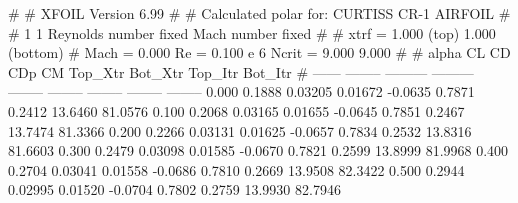 #  
#       XFOIL         Version 6.99
#  
# Calculated polar for: CURTISS CR-1 AIRFOIL                            
#  
# 1 1 Reynolds number fixed          Mach number fixed         
#  
# xtrf =   1.000 (top)        1.000 (bottom)  
# Mach =   0.000     Re =     0.100 e 6     Ncrit =   9.000  9.000
#  
#   alpha    CL        CD       CDp       CM     Top_Xtr  Bot_Xtr  Top_Itr  Bot_Itr
#  ------ -------- --------- --------- -------- -------- -------- -------- --------
   0.000   0.1888   0.03205   0.01672  -0.0635   0.7871   0.2412  13.6460  81.0576
   0.100   0.2068   0.03165   0.01655  -0.0645   0.7851   0.2467  13.7474  81.3366
   0.200   0.2266   0.03131   0.01625  -0.0657   0.7834   0.2532  13.8316  81.6603
   0.300   0.2479   0.03098   0.01585  -0.0670   0.7821   0.2599  13.8999  81.9968
   0.400   0.2704   0.03041   0.01558  -0.0686   0.7810   0.2669  13.9508  82.3422
   0.500   0.2944   0.02995   0.01520  -0.0704   0.7802   0.2759  13.9930  82.7946
